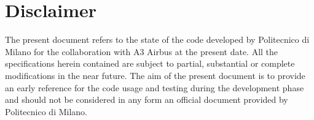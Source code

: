 \chapter*{Disclaimer}
The present document refers to the state of the code developed by Politecnico di Milano for the collaboration with A3 Airbus at the present date. All the specifications herein contained are subject to partial, substantial or complete modifications in the near future. The aim of the present document is to provide an early reference for the code usage and testing during the development phase and should not be considered in any form an official document provided by Politecnico di Milano.  
